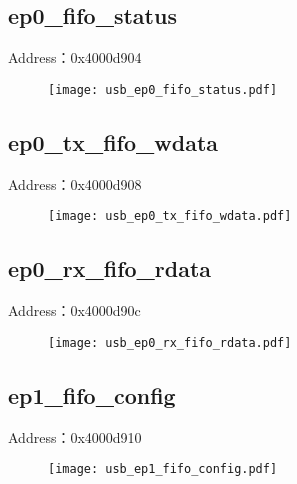 \subsection{ep0\_fifo\_status}
\label{usb-ep0-fifo-status}
Address：0x4000d904
 \begin{figure}[H]
\texttt{[image: usb\_ep0\_fifo\_status.pdf]}
\end{figure}

\subsection{ep0\_tx\_fifo\_wdata}
\label{usb-ep0-tx-fifo-wdata}
Address：0x4000d908
 \begin{figure}[H]
\texttt{[image: usb\_ep0\_tx\_fifo\_wdata.pdf]}
\end{figure}

\subsection{ep0\_rx\_fifo\_rdata}
\label{usb-ep0-rx-fifo-rdata}
Address：0x4000d90c
 \begin{figure}[H]
\texttt{[image: usb\_ep0\_rx\_fifo\_rdata.pdf]}
\end{figure}

\subsection{ep1\_fifo\_config}
\label{usb-ep1-fifo-config}
Address：0x4000d910
 \begin{figure}[H]
\texttt{[image: usb\_ep1\_fifo\_config.pdf]}
\end{figure}

